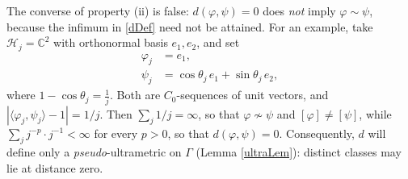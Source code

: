 \documentclass[twoside,11pt,letter]{article}
\def\bC{\mathbb{C}}
\def\cH{{\mathcal{H}}}
\theoremstyle{definition}
\theoremstyle{definition}
\theoremstyle{plain}
\newenvironment{remark}[1][Remark.]{\begin{trivlist}
\item[\hskip \labelsep {\bfseries #1}]}{\end{trivlist}}
\begin{document}
\begin{remark}
The converse of property (ii) is false: $d(\varphi,\psi)=0$ does \emph{not} imply $\varphi\sim\psi$, because the infimum in \eqref{dDef} need not be attained. For an example, take $\cH_j=\bC^2$ with orthonormal basis $e_1,e_2$, and set
\begin{equation*}
\begin{split}
\varphi_j&=e_1,\\\psi_j&=\cos\theta_j\, e_1+\sin\theta_j\, e_2,
\end{split}
\end{equation*}
where $1-\cos\theta_j=\frac1j$. Both are $C_0$-sequences of unit vectors, and $|\langle\varphi_j,\psi_j\rangle-1|=1/j$. Then $\sum_j 1/j=\infty$, so that $\varphi\not\sim\psi$ and $[\varphi]\neq[\psi]$, while $\sum_j j^{-p}\cdot j^{-1}<\infty$ for every $p>0$, so that $d(\varphi,\psi)=0$. Consequently, $d$ will define only a \emph{pseudo}-ultrametric on $\Gamma$ (Lemma \ref{ultraLem}): distinct classes may lie at distance zero.
\end{remark}
\end{document}

